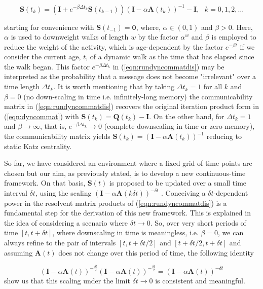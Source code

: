 \begin{equation}
\label{eqn:rundyncommatdis}
    \mathbf{S}(t_{k}) = \left(\mathbf{I} + e^{-\beta\Delta t_k} \mathbf{S}(t_{k-1})\right)\left(\mathbf{I} -  \alpha \mathbf{A}(t_{k})\right)^{-1} - \mathbf{I}, ~~~k=0,1,2,\dots
\end{equation}

 starting for convenience with $\mathbf{S}(t_{-1}) = \mathbf{0}$, where, $\alpha \in (0,1)$ and $\beta > 0$. Here, $\alpha$ is used to downweight walks of length $w$ by the factor $\alpha^w$ and $\beta$ is employed to reduce the weight of the activity, which is age-dependent by the factor $e^{-\beta t}$ if we consider the current age, $t$, of a dynamic walk as the time that has elapsed since the walk began. This factor $e^{-\beta\Delta t_k}$ in (\ref{eqn:rundyncommatdis}) may be interpreted as the probability that a message does not become "irrelevant" over a time length $\Delta t_k$. It is worth mentioning that by taking $\Delta t_k = 1$ for all $k$ and $\beta = 0$ (no down-scaling in time i.e. infinitely-long memory) the communicability matrix in (\ref{eqn:rundyncommatdis}) recovers the original iteration product form in (\ref{eqn:dyncommat}) with $\mathbf{S}(t_k) = \mathbf{Q}(t_k) - \mathbf{I}$. On the other hand, for $\Delta t_k = 1$ and $\beta \to \infty$, that is, $e^{-\beta\Delta t_k}\to 0$ (complete downscaling in time or zero memory), the communicability matrix yields $\mathbf{S}(t_k)=(\mathbf{I} - \alpha \mathbf{A}(t_k))^{-1}$ reducing to static Katz centrality.

 So far, we have considered an environment where a fixed grid of time points are chosen but our aim, as previously stated, is to develop a new continuous-time framework. On that basis, $\mathbf{S}(t)$ is proposed to be updated over a small time interval $\delta t$, using the scaling $(\mathbf{I}-\alpha\mathbf{A}(k\delta t))^{-\delta t}$ \cite{grindrod2014dynamical}. Conceiving a $\delta t$-dependent power in the resolvent matrix products of (\ref{eqn:rundyncommatdis}) is a fundamental step for the derivation of this new framework. This is explained in the idea of considering a scenario where $\delta t \to 0$. So, over very short periods of time $[t,t+\delta t]$, where downscaling in time is meaningless, i.e. $\beta = 0$, we can always refine to the pair of intervals $[t, t + \delta t/2]$ and $[t + \delta t/2, t + \delta t]$ and assuming $\mathbf{A}(t)$ does not change over this period of time, the following identity 

$$(\mathbf{I} - \alpha\mathbf{A}(t))^{-\frac{\delta t}{2}} (\mathbf{I} - \alpha\mathbf{A}(t))^{-\frac{\delta t}{2}} = (\mathbf{I} - \alpha\mathbf{A}(t))^{-\delta t}$$ show us that this scaling under the limit $\delta t \to 0$ is consistent and meaningful.
 
